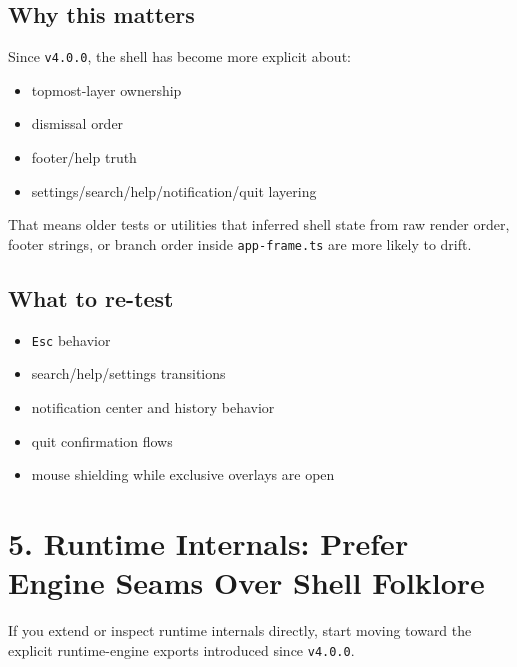 \subsection{Why this matters}\label{record-264-why-this-matters}

Since \texttt{v\allowbreak{}4\allowbreak{}.\allowbreak{}0\allowbreak{}.\allowbreak{}0}, the shell has become more explicit about:

\begin{itemize}
\tightlist
\item
  topmost-layer ownership
\item
  dismissal order
\item
  footer/help truth
\item
  settings/search/help/notification/quit layering
\end{itemize}

That means older tests or utilities that inferred shell state from raw render order, footer strings, or branch order inside \texttt{a\allowbreak{}p\allowbreak{}p\allowbreak{}-\allowbreak{}f\allowbreak{}r\allowbreak{}a\allowbreak{}m\allowbreak{}e\allowbreak{}.\allowbreak{}t\allowbreak{}s} are more likely to drift.

\subsection{What to re-test}\label{record-264-what-to-re-test}

\begin{itemize}
\tightlist
\item
  \texttt{E\allowbreak{}s\allowbreak{}c} behavior
\item
  search/help/settings transitions
\item
  notification center and history behavior
\item
  quit confirmation flows
\item
  mouse shielding while exclusive overlays are open
\end{itemize}

\section{5. Runtime Internals: Prefer Engine Seams Over Shell Folklore}\label{record-264-runtime-internals-prefer-engine-seams-over-shell-folklore}

If you extend or inspect runtime internals directly, start moving toward the explicit runtime-engine exports introduced since \texttt{v\allowbreak{}4\allowbreak{}.\allowbreak{}0\allowbreak{}.\allowbreak{}0}.

